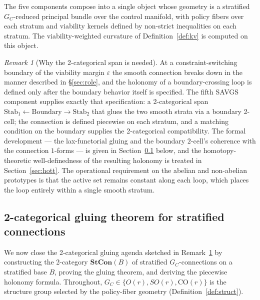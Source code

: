 \documentclass[11pt,a4paper]{article}
\theoremstyle{plain}
\theoremstyle{definition}
\theoremstyle{remark}
\newtheorem{remark}[theorem]{Remark}
\newcommand{\CO}{\mathrm{CO}}
\newcommand{\Stab}{\mathrm{Stab}}
\begin{document}
The five components compose into a single object whose geometry is a
stratified $G_C$-reduced principal bundle over the control manifold, with
policy fibers over each stratum and viability kernels defined by
non-strict inequalities on each stratum. The viability-weighted
curvature of Definition~\ref{def:kv} is computed on this
object.

\begin{remark}[Why the 2-categorical span is needed]
\label{rem:2cat-span}
At a constraint-switching boundary of the viability margin
$\varepsilon$ the smooth connection breaks down in the manner
described in \S\ref{sec:role}, and the holonomy of a
boundary-crossing loop is defined only after the boundary behavior
itself is specified. The fifth SAVGS component supplies exactly that
specification: a 2-categorical span
$\Stab_1\leftarrow\mathrm{Boundary}\rightarrow\Stab_2$ that glues the
two smooth strata via a boundary 2-cell; the connection is defined
piecewise on each stratum, and a matching condition on the boundary
supplies the 2-categorical compatibility. The formal development --- the lax-functorial gluing and the
boundary $2$-cell's coherence with the connection $1$-forms --- is
given in Section~\ref{sec:2cat-gluing} below, and the
homotopy-theoretic well-definedness of the resulting holonomy is
treated in Section~\ref{sec:hott}. The operational requirement on the abelian and non-abelian
prototypes is that the active set
remains constant along each loop, which places the loop entirely
within a single smooth stratum.
\end{remark}

\subsection{2-categorical gluing theorem for stratified connections}
\label{sec:2cat-gluing}

We now close the 2-categorical gluing agenda sketched in
Remark~\ref{rem:2cat-span} by constructing the 2-category
$\mathbf{StCon}(B)$ of stratified $G_C$-connections on a stratified base
$B$, proving the gluing theorem, and deriving the piecewise holonomy
formula. Throughout, $G_C \in \{O(r), SO(r), \CO(r)\}$ is the structure
group selected by the policy-fiber geometry (Definition~\ref{def:struct}).
\end{document}
